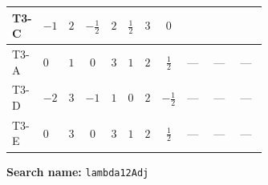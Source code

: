 \documentclass[8pt]{article}
\begin{document}
\begin{landscape}
\begin{longtable}{@{}llcccccc >{\raggedright\arraybackslash}p{0.21\linewidth} >{\raggedright\arraybackslash}p{0.21\linewidth} >{\raggedright\arraybackslash}p{0.21\linewidth}@{}}
\midrule
T3-C & $-1$ & $2$ & $-\frac{1}{2}$ & $2$ & $\frac{1}{2}$ & $3$ & $0$ & \scriptsize\adjustbox{max width=\linewidth}{$\begin{gathered} \frac{64}{3} {\lambda_{S_1^{\dagger 2}S_2^{\dagger 2}}} \left({\lambda_{S_1^{\dagger 2}S_2^{\dagger 2}}}\right)^{*}\end{gathered}$} & \scriptsize\adjustbox{max width=\linewidth}{$\begin{gathered} +\frac{4}{3} {\lambda_{S_1^\dagger S_2 S_2^{\dagger 2}}} (5 \left({\lambda_{S_1^\dagger S_2 S_2^{\dagger 2}}}\right)^{*}+\left({\lambda_{S_1 S_1^{\dagger 2}S_2^\dagger}}\right)^{*})\end{gathered}$} & \scriptsize\adjustbox{max width=\linewidth}{$\begin{gathered} +\frac{4}{3} {\lambda_{S_1 S_1^{\dagger 2}S_2^\dagger}} (\left({\lambda_{S_1^\dagger S_2 S_2^{\dagger 2}}}\right)^{*}+5 \left({\lambda_{S_1 S_1^{\dagger 2}S_2^\dagger}}\right)^{*})\end{gathered}$} \\
\midrule
T3-A & $0$ & $1$ & $0$ & $3$ & $1$ & $2$ & $\frac{1}{2}$ & --- & --- & --- \\
\midrule
T3-D & $-2$ & $3$ & $-1$ & $1$ & $0$ & $2$ & $-\frac{1}{2}$ & --- & --- & --- \\
\midrule
T3-E & $0$ & $3$ & $0$ & $3$ & $1$ & $2$ & $\frac{1}{2}$ & --- & --- & --- \\
\midrule
\bottomrule
\end{longtable}
\clearpage
\noindent\textbf{Search name: }\texttt{lambda12Adj}\par\smallskip

\end{landscape}
\end{document}
